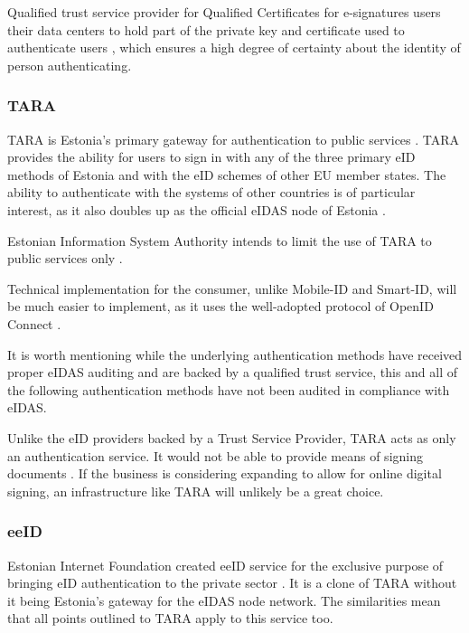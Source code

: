 Qualified trust service provider for Qualified Certificates for e-signatures users their data centers to hold part of the private key and certificate used to authenticate users \cite{eu-trustservices}, which ensures a high degree of certainty about the identity of person authenticating.

\subsubsection{TARA}

TARA is Estonia's primary gateway for authentication to public services \cite{tara}. TARA provides the ability for users to sign in with any of the three primary eID methods of Estonia and with the eID schemes of other EU member states. The ability to authenticate with the systems of other countries is of particular interest, as it also doubles up as the official eIDAS node of Estonia \cite{tara}.

Estonian Information System Authority intends to limit the use of TARA to public services only \cite{tara-business}.

Technical implementation for the consumer, unlike Mobile-ID and Smart-ID, will be much easier to implement, as it uses the well-adopted protocol of OpenID Connect \cite{tara-technical, oidc}.

It is worth mentioning while the underlying authentication methods have received proper eIDAS auditing and are backed by a qualified trust service, this and all of the following authentication methods have not been audited in compliance with eIDAS.

Unlike the eID providers backed by a Trust Service Provider, TARA acts as only an authentication service. It would not be able to provide means of signing documents \cite{tara-technical}. If the business is considering expanding to allow for online digital signing, an infrastructure like TARA will unlikely be a great choice.

\subsubsection{eeID}

Estonian Internet Foundation created eeID service for the exclusive purpose of bringing eID authentication to the private sector \cite{eeid}. It is a clone of TARA without it being Estonia's gateway for the eIDAS node network. The similarities mean that all points outlined to TARA apply to this service too.

